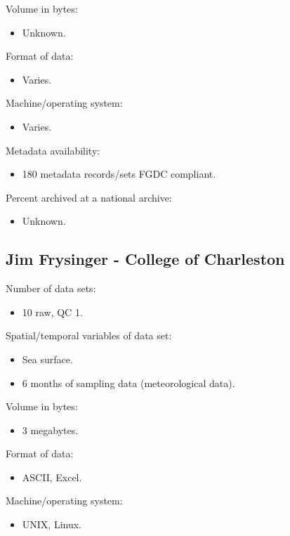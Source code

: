 Volume in bytes:
\begin{itemize}
  \item Unknown.
\end{itemize}

Format of data:
\begin{itemize}
  \item Varies.
\end{itemize}

Machine/operating system:
\begin{itemize}
  \item Varies.
\end{itemize}

Metadata availability:
\begin{itemize}
  \item 180 metadata records/sets FGDC compliant.
\end{itemize}

Percent archived at a national archive:
\begin{itemize}
  \item Unknown.
\end{itemize}


\subsection{Jim Frysinger - College of Charleston}

Number of data sets:
\begin{itemize}
  \item 10 raw, QC 1.
\end{itemize}

Spatial/temporal variables of data set:
\begin{itemize}
  \item Sea surface.
  \item 6 months of sampling data (meteorological data).
\end{itemize}

Volume in bytes:
\begin{itemize}
  \item 3 megabytes.
\end{itemize}

Format of data:
\begin{itemize}
  \item ASCII, Excel.
\end{itemize}

Machine/operating system:
\begin{itemize}
  \item UNIX, Linux.
\end{itemize}

